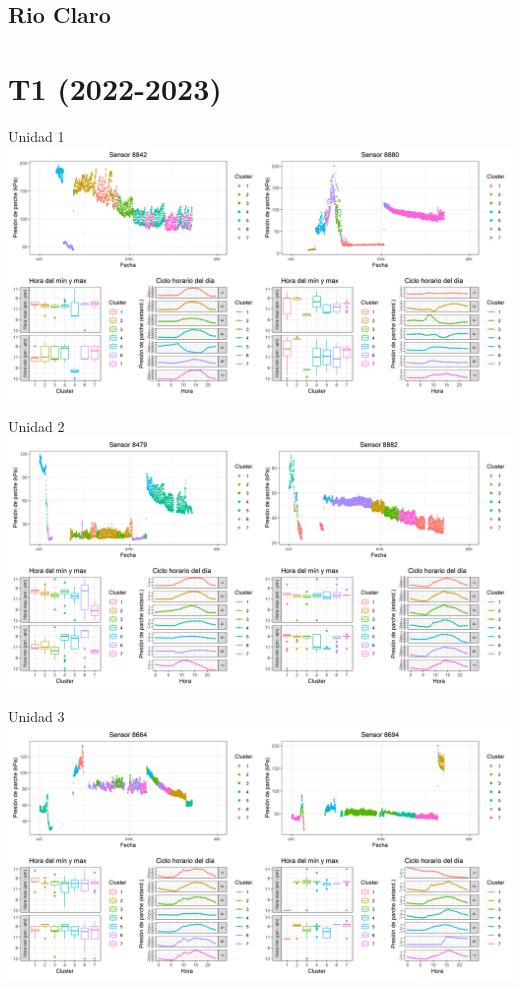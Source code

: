 \documentclass[
  letterpaper,
  DIV=11,
  numbers=noendperiod]{scrreprt}
\begin{document}
\section{Rio Claro}\label{rio-claro-1}

\chapter{T1 (2022-2023)}

Unidad 1
\includegraphics{figuras/01_turgor_sensor/2022_2023_Rio_Claro_T1_Unidad_1.png}

Unidad 2
\includegraphics{figuras/01_turgor_sensor/2022_2023_Rio_Claro_T1_Unidad_2.png}

Unidad 3
\includegraphics{figuras/01_turgor_sensor/2022_2023_Rio_Claro_T1_Unidad_3.png}
\end{document}
